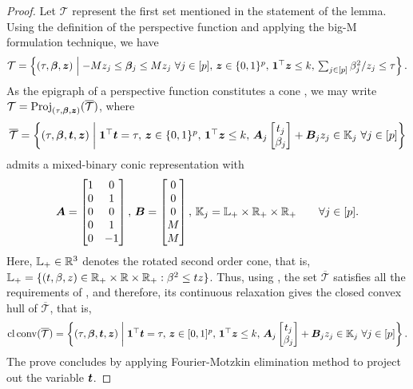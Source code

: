 \begin{proof}
    Let $\mathcal T$ represent the first set mentioned in the statement of the lemma. Using the definition of the perspective function and applying the big-M formulation technique, we have
    \begin{align*}
        \textstyle \mathcal T = \left\{ (\tau, \bm{\beta}, \bm{z})  \;\middle|\; -M z_j\leq \bm{\beta}_j \leq M z_j ~ \forall j \in [p], \, \bm{z} \in \{0, 1\}^p, \, \mathbf{1}^\top \bm{z} \leq k, \, \sum_{j \in [p]} \beta_j^2 / z_j \leq \tau \right\}.
    \end{align*}
    As the epigraph of a perspective function constitutes a cone \citep[Lemma~1 \& 2]{shafiee2024constrained}, we may write $\mathcal T = \mathrm{Proj}_{(\tau, \bm{\beta}, \bm{z})}(\overline {\mathcal T})$, where 
    \begin{align*}
        \textstyle \overline {\mathcal T} = \left\{ (\tau, \bm{\beta}, \bm{t}, \bm{z}) \;\middle|\; \bm 1^\top \bm{t} = \tau, \, \bm{z} \in \{0, 1\}^p, \, \mathbf{1}^\top \bm{z} \leq k, \, \bm A_j \begin{bmatrix} t_j \\ \beta_j \end{bmatrix} + \bm B_j z_j \in \mathbb K_j ~ \forall j \in [p] \right\}
    \end{align*}
    admits a mixed-binary conic representation with
    \begin{align*}
        \bm A = \begin{bmatrix} 1 & 0 \\ 0 & 1 \\ 0 & 0 \\ 0 & 1 \\ 0 & -1 \end{bmatrix}, \,
        \bm B = \begin{bmatrix} 0 \\ 0 \\ 0 \\ M \\ M \end{bmatrix}, \,
        \mathbb K_j = \mathbb L_+ \times \mathbb{R}_+ \times \mathbb{R}_+ \qquad \forall j \in [p].
    \end{align*}
    Here, $\mathbb L_+ \in \mathbb{R}^3$ denotes the rotated second order cone, that is, $\mathbb L_+ = \{ (t, \beta, z) \in \mathbb{R}_+ \times \mathbb{R} \times \mathbb{R}_+: \beta^2 \leq t z  \}$.
    Thus, using \citep[Lemma~4]{shafiee2024constrained}, the set $\overline{\mathcal T}$ satisfies all the requirements of \citep[Theorem~1]{shafiee2024constrained}, and therefore, its continuous relaxation gives the closed convex hull of $\overline{\mathcal T}$, that is,
    \begin{align*}
        \textstyle \operatorname{cl} \operatorname{conv}(\overline {\mathcal T}) = \left\{ (\tau, \bm{\beta}, \bm{t}, \bm{z}) \;\middle|\; \bm 1^\top \bm{t} = \tau, \, \bm{z} \in [0, 1]^p, \, \mathbf{1}^\top \bm{z} \leq k, \, \bm A_j \begin{bmatrix} t_j \\ \beta_j \end{bmatrix} + \bm B_j z_j \in \mathbb K_j ~ \forall j \in [p] \right\}.
    \end{align*}
    The prove concludes by applying Fourier-Motzkin elimination method to project out the variable $\bm{t}$.
\end{proof} 

